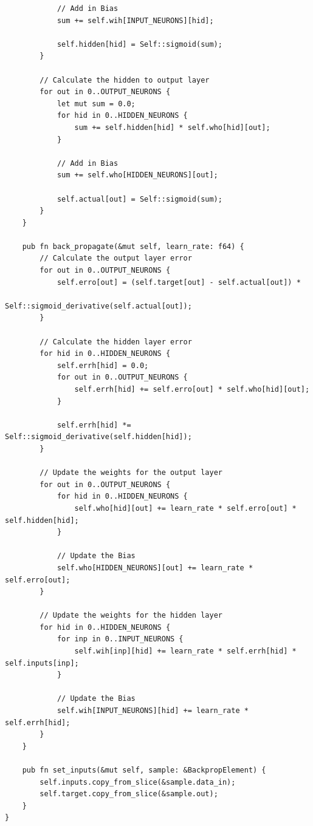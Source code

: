 \documentclass[a4paper,14pt]{extarticle}
\begin{document}
\begin{verbatim}
            // Add in Bias
            sum += self.wih[INPUT_NEURONS][hid];

            self.hidden[hid] = Self::sigmoid(sum);
        }

        // Calculate the hidden to output layer
        for out in 0..OUTPUT_NEURONS {
            let mut sum = 0.0;
            for hid in 0..HIDDEN_NEURONS {
                sum += self.hidden[hid] * self.who[hid][out];
            }

            // Add in Bias
            sum += self.who[HIDDEN_NEURONS][out];

            self.actual[out] = Self::sigmoid(sum);
        }
    }

    pub fn back_propagate(&mut self, learn_rate: f64) {
        // Calculate the output layer error
        for out in 0..OUTPUT_NEURONS {
            self.erro[out] = (self.target[out] - self.actual[out]) * 
                             Self::sigmoid_derivative(self.actual[out]);
        }

        // Calculate the hidden layer error
        for hid in 0..HIDDEN_NEURONS {
            self.errh[hid] = 0.0;
            for out in 0..OUTPUT_NEURONS {
                self.errh[hid] += self.erro[out] * self.who[hid][out];
            }

            self.errh[hid] *= Self::sigmoid_derivative(self.hidden[hid]);
        }

        // Update the weights for the output layer
        for out in 0..OUTPUT_NEURONS {
            for hid in 0..HIDDEN_NEURONS {
                self.who[hid][out] += learn_rate * self.erro[out] * self.hidden[hid];
            }

            // Update the Bias
            self.who[HIDDEN_NEURONS][out] += learn_rate * self.erro[out];
        }

        // Update the weights for the hidden layer
        for hid in 0..HIDDEN_NEURONS {
            for inp in 0..INPUT_NEURONS {
                self.wih[inp][hid] += learn_rate * self.errh[hid] * self.inputs[inp];
            }

            // Update the Bias
            self.wih[INPUT_NEURONS][hid] += learn_rate * self.errh[hid];
        }
    }

    pub fn set_inputs(&mut self, sample: &BackpropElement) {
        self.inputs.copy_from_slice(&sample.data_in);
        self.target.copy_from_slice(&sample.out);
    }
}
\end{verbatim}
\end{document}
